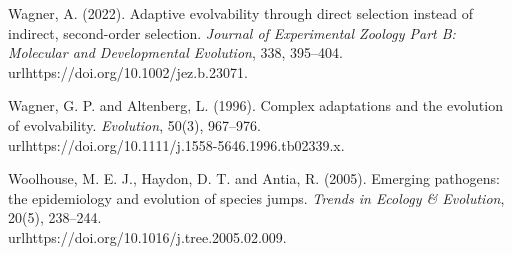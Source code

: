\documentclass[11pt]{article}
\begin{document}
Wagner, A. (2022). Adaptive evolvability through direct selection
instead of indirect, second-order selection. \emph{Journal of
Experimental Zoology Part B: Molecular and Developmental Evolution},
338, 395--404. \\url{https://doi.org/10.1002/jez.b.23071}.

Wagner, G. P. and Altenberg, L. (1996). Complex adaptations and the
evolution of evolvability. \emph{Evolution}, 50(3), 967--976.
\\url{https://doi.org/10.1111/j.1558-5646.1996.tb02339.x}.

Woolhouse, M. E. J., Haydon, D. T. and Antia, R. (2005). Emerging
pathogens: the epidemiology and evolution of species jumps. \emph{Trends
in Ecology \& Evolution}, 20(5), 238--244.
\\url{https://doi.org/10.1016/j.tree.2005.02.009}.
\end{document}
